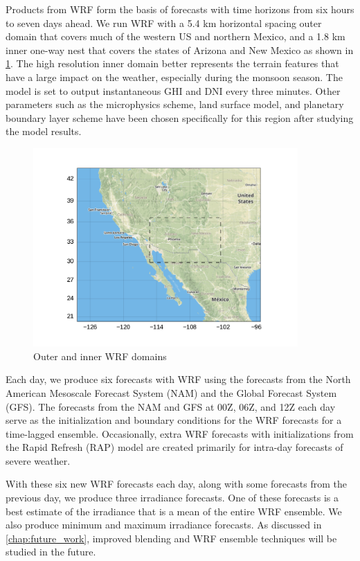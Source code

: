 Products from WRF form the basis of forecasts with time horizons from
six hours to seven days ahead.
We run WRF with a 5.4 km horizontal spacing outer domain that covers
much of the western US and northern Mexico, and a 1.8 km inner one-way
nest that covers the states of Arizona and New Mexico as shown in
\cref{fig:wrfdomains}.
The high resolution inner domain better represents the terrain
features that have a large impact on the weather, especially during
the monsoon season.
The model is set to output instantaneous GHI and DNI every three minutes.
Other parameters such as the microphysics scheme, land surface model,
and planetary boundary layer scheme have been chosen specifically for
this region after studying the model results.

\begin{figure}[htb]
\centering
\includegraphics[width=0.9\textwidth]{figs/domains.pdf}
\vspace{-1.5em}
\caption{Outer and inner WRF domains}
\label{fig:wrfdomains}
\end{figure}

Each day, we produce six forecasts with WRF using the forecasts from
the North American Mesoscale Forecast System (NAM) and the Global
Forecast System (GFS).
The forecasts from the NAM and GFS at 00Z, 06Z, and 12Z each day serve
as the initialization and boundary conditions for the WRF forecasts for
a time-lagged ensemble.
Occasionally, extra WRF forecasts with initializations from the Rapid
Refresh (RAP) model are created primarily for intra-day forecasts of
severe weather.

With these six new WRF forecasts each day, along with some forecasts
from the previous day, we produce three irradiance forecasts.
One of these forecasts is a best estimate of the irradiance that is a
mean of the entire WRF ensemble.
We also produce minimum and maximum irradiance forecasts.
As discussed in \cref{chap:future_work}, improved blending and WRF
ensemble techniques will be studied in the future.

